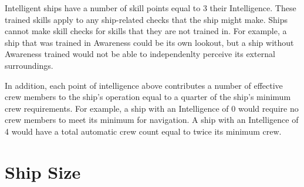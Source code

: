     Intelligent ships have a number of skill points equal to 3 \add their Intelligence.
    These trained skills apply to any ship-related checks that the ship might make.
    Ships cannot make skill checks for skills that they are not trained in.
    For example, a ship that was trained in Awareness could be its own lookout, but a ship without Awareness trained would not be able to independenlty perceive its external surroundings.

    In addition, each point of intelligence above  contributes a number of effective crew members to the ship's operation equal to a quarter of the ship's minimum crew requirements.
    For example, a ship with an Intelligence of 0 would require no crew members to meet its minimum for navigation.
    A ship with an Intelligence of 4 would have a total automatic crew count equal to twice its minimum crew.

\section{Ship Size}\label{Ship Size}

